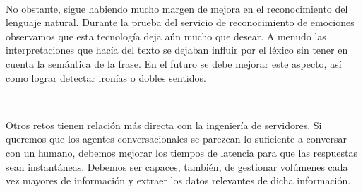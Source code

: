 \documentclass[paper=a4, fontsize=10pt]{scrartcl} %
\numberwithin{equation}{section} %
\numberwithin{figure}{section} %
\numberwithin{table}{section} %
\begin{document}
\

No obstante, sigue habiendo mucho margen de mejora en el reconocimiento del lenguaje natural. Durante la prueba del servicio de reconocimiento de emociones observamos que esta tecnología deja aún mucho que desear. A menudo las interpretaciones que hacía del texto se dejaban influir por el léxico sin tener en cuenta la semántica de la frase. En el futuro se debe mejorar este aspecto, así como lograr detectar ironías o dobles sentidos.

\

Otros retos tienen relación más directa con la ingeniería de servidores. Si queremos que los agentes conversacionales se parezcan lo suficiente a conversar con un humano, debemos mejorar los tiempos de latencia para que las respuestas sean instantáneas. Debemos ser capaces, también, de gestionar volúmenes cada vez mayores de información y extraer los datos relevantes de dicha información.


\newpage
\end{document}
